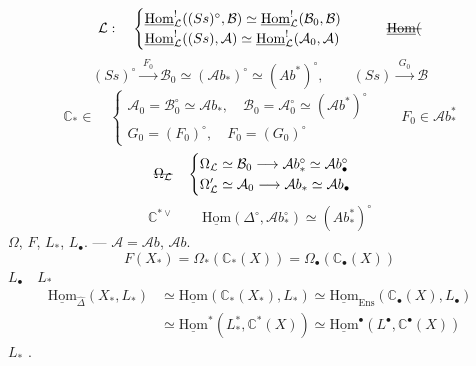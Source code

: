 \documentclass[11pt,a4paper]{article}
\begin{document}
\[
\mathcal{L} : \quad
\begin{cases}
\underline{\mathrm{Hom}}^!_{\mathcal{L}}((Ss)^\circ , \mathcal{B}) \simeq \underline{\mathrm{Hom}}^!_{\mathcal{L}}(\mathcal{B}_0 , \mathcal{B}) \\
\underline{\mathrm{Hom}}^!_{\mathcal{L}}((Ss) , \mathcal{A}) \simeq \underline{\mathrm{Hom}}^!_{\mathcal{L}}(\mathcal{A}_0 , \mathcal{A})
\end{cases}
\qquad \text{\struck{$\underline{\mathrm{Hom}}($}}
\]
\[
(Ss)^\circ \xrightarrow{\;F_0\;} \mathcal{B}_0 \simeq (\mathcal{A}b_*)^\circ \simeq (Ab^*)^\circ ,
\qquad
(Ss) \xrightarrow{\;G_0\;} \mathcal{B}
\]
\[
\mathbb{C}_* \in \quad
\begin{cases}
\mathcal{A}_0 = \mathcal{B}_0^\circ \simeq \mathcal{A}b_* , \quad \mathcal{B}_0 = \mathcal{A}_0^\circ \simeq (\mathcal{A}b^*)^\circ \\
G_0 = (F_0)^\circ , \quad F_0 = (G_0)^\circ
\end{cases}
\qquad F_0 \in \mathcal{A}b^*_*
\]
\[
\text{\struck{$\Omega_{\mathcal{L}}$}} \quad
\begin{cases}
\Omega_{\mathcal{L}} \simeq \mathcal{B}_0 \longrightarrow \mathcal{A}b_*^\circ \simeq \mathcal{A}b_\bullet^\circ \\
\Omega'_{\mathcal{L}} \simeq \mathcal{A}_0 \longrightarrow \mathcal{A}b_* \simeq \mathcal{A}b_\bullet
\end{cases}
\]
\[
\mathbb{C}^{*\vee} \qquad
\underline{\mathrm{Hom}}(\Delta^\circ , \mathcal{A}b_*^\circ) \simeq (Ab^*_*)^\circ
\]
$\Omega$, $F$, $L_*$, $L_\bullet$. —  $\mathcal{A} = \mathcal{A}b$, \ill{}  \ill{}  $\mathcal{A}b$.
\[
\boxed{\, F(X_*) = \Omega_*(\mathbb{C}_*(X)) = \Omega_\bullet(\mathbb{C}_\bullet(X)) \,}
\]
$L_\bullet \quad L_*$
\[
\begin{aligned}
\underline{\mathrm{Hom}}_{\hat{\Delta}}(X_* , L_*) &\simeq \underline{\mathrm{Hom}}(\mathbb{C}_*(X_*) , L_*) \simeq \underline{\mathrm{Hom}}_{\mathrm{Ens}}(\mathbb{C}_\bullet(X) , L_\bullet) \\
&\simeq \underline{\mathrm{Hom}}^*(L^*_* , \mathbb{C}^*(X)) \simeq \underline{\mathrm{Hom}}^\bullet(L^\bullet , \mathbb{C}^\bullet(X))
\end{aligned}
\]
 $L_*$ \ill{}.
\end{document}
